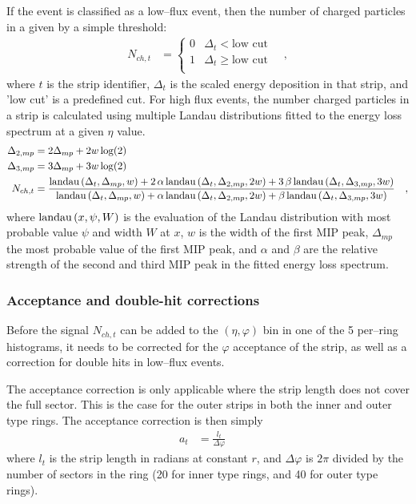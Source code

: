 \documentclass[11pt]{article}
\newcommand{\landau}[1]{{\ensuremath%
    \text{landau}\left(#1\right)}}
\begin{document}
If the event is classified as a low--flux event, then the number of
charged particles in a given by a simple threshold: 
\begin{align}
  N_{ch,t} &= \left\{
    \begin{array}{cl}
      0 & \Delta_t < \text{low cut}\\ 
      1 & \Delta_t \ge \text{low cut}\\ 
    \end{array}\right.\quad,
\end{align}
where $t$ is the strip identifier, $\Delta_t$ is the scaled energy
deposition in that strip, and 'low cut' is a predefined cut.  For high
flux events, the number charged particles in a strip is calculated
using multiple Landau distributions fitted to the energy loss spectrum
at a given $\eta$ value.  
\begin{align}
  \Delta_{2,mp} &= 2 \Delta_{mp}+ 2 w \log(2)\nonumber\\
  \Delta_{3,mp} &= 3 \Delta_{mp}+ 3 w \log(2)\nonumber\\
  N_{ch,t} &= \frac{\landau{\Delta_t,\Delta_{mp},w}+
    2\,\alpha\,\landau{\Delta_t,\Delta_{2,mp},2w} + 
    3\,\beta\,\landau{\Delta_t,\Delta_{3,mp},3w}}{%
    \landau{\Delta_t,\Delta_{mp},w}+
    \alpha\,\landau{\Delta_t,\Delta_{2,mp},2w} + 
    \beta\,\landau{\Delta_t,\Delta_{3,mp},3w}}\quad,
\end{align}
where $\landau{x,\psi,W}$ is the evaluation of the Landau distribution
with most probable value $\psi$ and width $W$ at $x$, $w$ is the width
of the first MIP peak, $\Delta_{mp}$ the most probable value of
the first MIP peak, and $\alpha$ and
$\beta$ are the relative strength of the second and third MIP peak in
the fitted energy loss spectrum. 

\subsubsection{Acceptance and double-hit corrections}

Before the signal $N_{ch,t}$ can be added to the $(\eta,\varphi)$
bin in one of the 5 per--ring histograms, it needs to be corrected for
the $\varphi$ acceptance of the strip, as well as a correction for
double hits in low--flux events.   

The acceptance correction is only applicable where the strip length
does not cover the full sector.  This is the case for the outer strips
in both the inner and outer type rings.  The acceptance correction is
then simply 
\begin{align}
  \label{eq:acc_corr}
  a_t &= \frac{l_t}{\Delta\varphi}\quad
\end{align}
where $l_t$ is the strip length in radians at constant $r$, and
$\Delta\varphi$ is $2\pi$ divided by the number of sectors in the
ring (20 for inner type rings, and 40 for outer type rings). 
\end{document}
